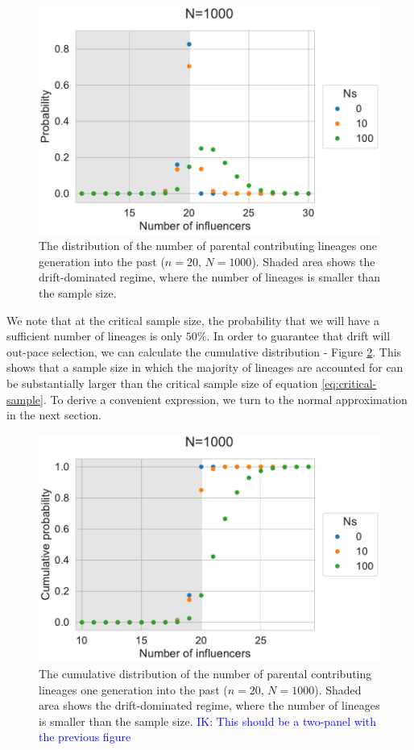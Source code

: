 \documentclass[review]{elsarticle}
\newcommand{\ikcomment}[1]{\textcolor{blue}{IK: #1}}
\begin{document}
\begin{figure}
  \centering
  \includegraphics[]{fig/sampling-dist.pdf}
  \caption{The distribution of the number of parental contributing lineages one generation into the
    past ($n=20$, $N=1000$). Shaded area shows the drift-dominated regime, where the number of
    lineages is smaller than the sample size.}
  \label{fig:sampling-dist}
\end{figure}

We note that at the critical sample size, the probability that we will have a sufficient number of
lineages is only $50\%$. In order to guarantee that drift will out-pace selection, we can calculate
the cumulative distribution - Figure \ref{fig:cumulative-dist}. This shows that a sample size in
which the majority of lineages are accounted for can be substantially larger than the critical
sample size of equation \eqref{eq:critical-sample}. To derive a convenient expression, we turn to
the normal approximation in the next section.

\begin{figure}
  \centering
  \includegraphics[]{fig/cumulative-dist.pdf}
   \caption{The cumulative distribution of the number of parental contributing lineages one generation into the
    past ($n=20$, $N=1000$). Shaded area shows the drift-dominated regime, where the number of
    lineages is smaller than the sample size. \ikcomment{This should be a two-panel with the
      previous figure}}
  \label{fig:cumulative-dist}
\end{figure}
\end{document}
